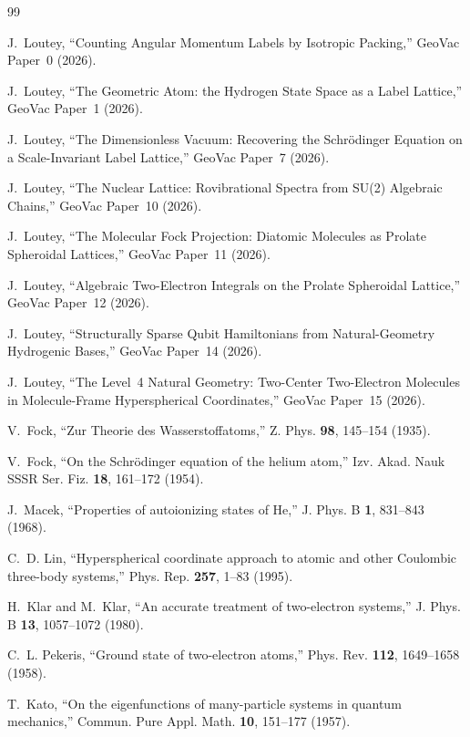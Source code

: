 \documentclass[aps,pra,twocolumn,superscriptaddress,longbibliography]{revtex4-2}
\begin{document}
\begin{thebibliography}{99}

J.~Loutey,
``Counting Angular Momentum Labels by Isotropic Packing,''
GeoVac Paper~0 (2026).

J.~Loutey,
``The Geometric Atom: the Hydrogen State Space as a Label Lattice,''
GeoVac Paper~1 (2026).

J.~Loutey,
``The Dimensionless Vacuum: Recovering the Schr\"odinger Equation
on a Scale-Invariant Label Lattice,''
GeoVac Paper~7 (2026).

J.~Loutey,
``The Nuclear Lattice: Rovibrational Spectra from SU(2) Algebraic
Chains,''
GeoVac Paper~10 (2026).

J.~Loutey,
``The Molecular Fock Projection: Diatomic Molecules as Prolate
Spheroidal Lattices,''
GeoVac Paper~11 (2026).

J.~Loutey,
``Algebraic Two-Electron Integrals on the Prolate Spheroidal
Lattice,''
GeoVac Paper~12 (2026).

J.~Loutey,
``Structurally Sparse Qubit Hamiltonians from Natural-Geometry Hydrogenic Bases,''
GeoVac Paper~14 (2026).

J.~Loutey,
``The Level~4 Natural Geometry: Two-Center Two-Electron Molecules in Molecule-Frame Hyperspherical Coordinates,''
GeoVac Paper~15 (2026).

V.~Fock,
``Zur Theorie des Wasserstoffatoms,''
Z. Phys. \textbf{98}, 145--154 (1935).

V.~Fock,
``On the Schr\"odinger equation of the helium atom,''
Izv. Akad. Nauk SSSR Ser. Fiz. \textbf{18}, 161--172 (1954).

J.~Macek,
``Properties of autoionizing states of He,''
J. Phys. B \textbf{1}, 831--843 (1968).

C.~D. Lin,
``Hyperspherical coordinate approach to atomic and other Coulombic
three-body systems,''
Phys. Rep. \textbf{257}, 1--83 (1995).

H.~Klar and M.~Klar,
``An accurate treatment of two-electron systems,''
J. Phys. B \textbf{13}, 1057--1072 (1980).

C.~L. Pekeris,
``Ground state of two-electron atoms,''
Phys. Rev. \textbf{112}, 1649--1658 (1958).

T.~Kato,
``On the eigenfunctions of many-particle systems in quantum
mechanics,''
Commun. Pure Appl. Math. \textbf{10}, 151--177 (1957).


\end{thebibliography}
\end{document}
